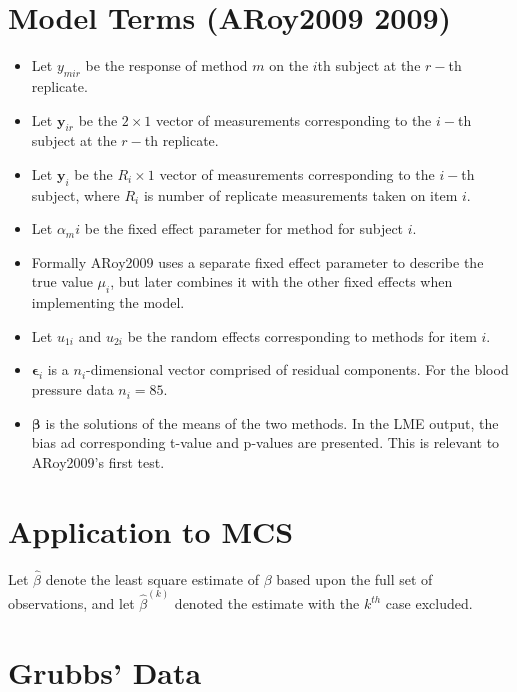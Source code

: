 \documentclass[12pt, a4paper]{report}
\theoremstyle{plain}
\theoremstyle{definition}
\theoremstyle{remark}
\begin{document}
	\section{Model Terms (ARoy2009 2009)}
	\begin{itemize}
		\item Let $y_{mir}$ be the response of method $m$ on the $i$th subject
		at the $r-$th replicate.
		\item Let $\boldsymbol{y}_{ir}$ be the $2 \times 1$ vector of measurements
		corresponding to the $i-$th subject at the $r-$th replicate.
		\item Let $\boldsymbol{y}_{i}$ be the $R_i \times 1$ vector of
		measurements corresponding to the $i-$th subject, where $R_i$ is number of replicate measurements taken on item $i$.
		\item Let $\alpha_mi$ be the fixed effect parameter for method for subject $i$.
		\item Formally ARoy2009 uses a separate fixed effect parameter to describe the true value $\mu_i$, but later combines it with the other fixed effects when implementing the model.
		\item Let $u_{1i}$ and $u_{2i}$ be the random effects corresponding to methods for item $i$.
		
		\item $\boldsymbol{\epsilon}_{i}$ is a $n_{i}$-dimensional vector
		comprised of residual components. For the blood pressure data $n_{i} = 85$.
		
		\item $\boldsymbol{\beta}$ is the solutions of the means of the two methods. In the LME output, the bias ad corresponding
		t-value and p-values are presented. This is relevant to ARoy2009's first test.\end{itemize}
	
	
	
	\section{Application to MCS} %
	
	Let $\hat{\beta}$ denote the least square estimate of $\beta$
	based upon the full set of observations, and let
	$\hat{\beta}^{(k)}$ denoted the estimate with the $k^{th}$ case
	excluded.
	
	
	\section{Grubbs' Data} %
	
\end{document}
